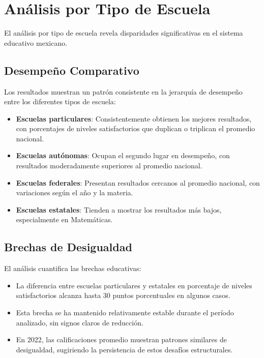 \section{Análisis por Tipo de Escuela}
El análisis por tipo de escuela revela disparidades significativas en el sistema educativo mexicano.

\subsection{Desempeño Comparativo}
Los resultados muestran un patrón consistente en la jerarquía de desempeño entre los diferentes tipos de escuela:

\begin{itemize}
    \item \textbf{Escuelas particulares}: Consistentemente obtienen los mejores resultados, con porcentajes de niveles satisfactorios que duplican o triplican el promedio nacional.
    
    \item \textbf{Escuelas autónomas}: Ocupan el segundo lugar en desempeño, con resultados moderadamente superiores al promedio nacional.
    
    \item \textbf{Escuelas federales}: Presentan resultados cercanos al promedio nacional, con variaciones según el año y la materia.
    
    \item \textbf{Escuelas estatales}: Tienden a mostrar los resultados más bajos, especialmente en Matemáticas.
\end{itemize}

\subsection{Brechas de Desigualdad}
El análisis cuantifica las brechas educativas:

\begin{itemize}
    \item La diferencia entre escuelas particulares y estatales en porcentaje de niveles satisfactorios alcanza hasta 30 puntos porcentuales en algunos casos.
    
    \item Esta brecha se ha mantenido relativamente estable durante el período analizado, sin signos claros de reducción.
    
    \item En 2022, las calificaciones promedio muestran patrones similares de desigualdad, sugiriendo la persistencia de estos desafíos estructurales.
\end{itemize}


